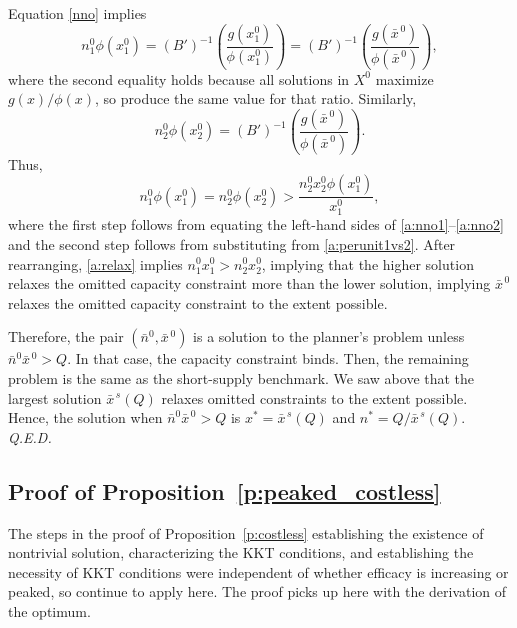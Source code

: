 \documentclass[12pt]{article}
\renewcommand{\qed}{{\it Q.E.D.}}
\newcommand{\efficacy}{\phi}
\newcommand{\general}{g}
\newcommand{\benefit}{B}
\newcommand{\xshortbar}{\bar{x}^{\,s}}
\newcommand{\xno}{x^{0}}
\newcommand{\Xno}{X^{0}}
\newcommand{\xnobar}{\bar{x}^{\,0}}
\newcommand{\nno}{n^{0}}
\newcommand{\nnobar}{\bar{n}^{0}}
\begin{document}
Equation \eqref{nno} implies
\begin{equation}
\label{a:nno1}
\nno_1 \efficacy(\xno_1) = (\benefit')^{-1} \! \left(
\frac{\general(\xno_1)}{\efficacy(\xno_1)} \right) = (\benefit')^{-1} \!
\left( \frac{\general(\xnobar)}{\efficacy(\xnobar)} \right),
\end{equation}
where the second equality holds because all solutions in $\Xno$
maximize $\general(x) / \efficacy(x)$, so produce the same value for
that ratio. Similarly,
\begin{equation}
\label{a:nno2}
\nno_2 \efficacy(\xno_2) = (\benefit')^{-1} \! \left(
\frac{\general(\xnobar)}{\efficacy(\xnobar)} \right).
\end{equation}
Thus,
\begin{equation}
\label{a:relax}
\nno_1 \efficacy(\xno_1) = \nno_2 \efficacy(\xno_2) > \frac{\nno_2 \xno_2 \efficacy(\xno_1)}{\xno_1},  
\end{equation}
where the first step follows from equating the left-hand sides of
\eqref{a:nno1}--\eqref{a:nno2} and the second step follows from
substituting from \eqref{a:perunit1vs2}. After rearranging,
\eqref{a:relax} implies $\nno_1 \xno_1 > \nno_2
\xno_2$, implying that the higher solution relaxes the omitted
capacity constraint more than the lower solution, implying $\xnobar$
relaxes the omitted capacity constraint to the extent possible.

Therefore, the pair $(\nnobar, \xnobar)$ is a solution to the
planner's problem unless $\nnobar \xnobar > Q$. In that case, the
capacity constraint binds. Then, the remaining problem is the same as
the short-supply benchmark. We saw above that the largest solution
$\xshortbar\!(Q)$ relaxes omitted constraints to the extent
possible. Hence, the solution when $\nnobar \xnobar > Q$ is $x^* =
\xshortbar\!(Q)$ and $n^* = Q / \xshortbar\!(Q)$. \qed


\subsection*{Proof of Proposition~\ref{p:peaked_costless}}

The steps in the proof of Proposition~\ref{p:costless} establishing
the existence of nontrivial solution, characterizing the KKT
conditions, and establishing the necessity of KKT conditions were
independent of whether efficacy is increasing or peaked, so continue
to apply here. The proof picks up here with the derivation of the
optimum.
\end{document}

